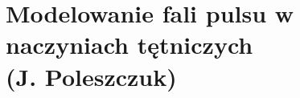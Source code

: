 \chapter[Modelowanie fali pulsu w naczyniach tętniczych]{Modelowanie fali pulsu w naczyniach tętniczych\\{\large (J. Poleszczuk)}}